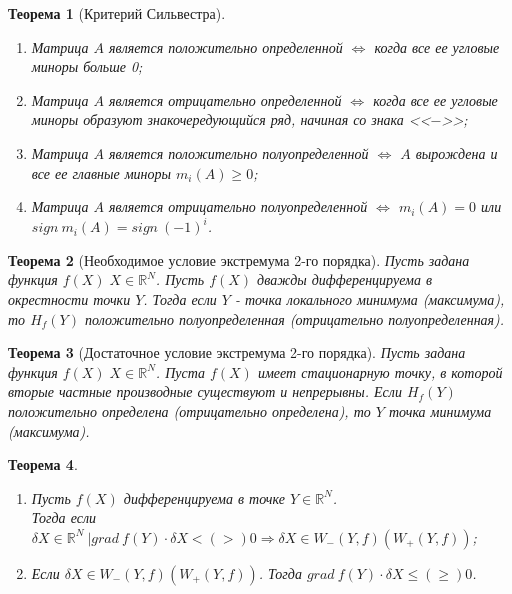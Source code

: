 \documentclass[12pt]{article}
\newtheorem{theorem}{Теорема}[section]
\theoremstyle{definition}
\theoremstyle{remark}
\begin{document}
\begin{theorem}[Критерий Сильвестра]
  \item
\begin{enumerate}
  \item Матрица $A$ является положительно определенной $\iff$ когда все ее угловые миноры больше 0;
  \item Матрица $A$ является отрицательно определенной $\iff$ когда все ее угловые миноры образуют знакочередующийся ряд, начиная со знака <<$-$>>;
  \item Матрица $A$ является положительно полуопределенной $\iff$ $A$ вырождена и все ее главные миноры $m_i(A)\geqslant 0$;
  \item Матрица $A$ является отрицательно полуопределенной $\iff$ $m_i(A)=0$ или $sign\:m_i(A)=sign\:(-1)^i$.
\end{enumerate}
\end{theorem}
\begin{theorem}[Необходимое условие экстремума 2-го порядка]
Пусть задана функция $f(X)\;X\in\mathbb{R}^N$. Пусть  $f(X)$ дважды дифференцируема в окрестности точки $Y$. Тогда если $Y$ - точка локального минимума (максимума), то $H_f(Y)$ положительно полуопределенная (отрицательно полуопределенная).
\end{theorem}
\begin{theorem}[Достаточное условие экстремума 2-го порядка]
Пусть задана функция $f(X)\;X\in\mathbb{R}^N$. Пуста $f(X)$ имеет стационарную точку, в которой вторые частные производные существуют и непрерывны. Если $H_f(Y)$ положительно определена (отрицательно определена), то $Y$ точка минимума (максимума).
\end{theorem}
\begin{theorem}
  \item
  \begin{enumerate}
    \item Пусть $f(X)$ дифференцируема в точке $Y\in\mathbb{R}^N$. \\Тогда если $\delta X\in\mathbb{R}^N \:\big| grad\:f(Y)\cdot \delta X <(>)0
  \Rightarrow \delta X \in W_-(Y,f)(W_+(Y,f))$;
  \item Если $\delta X \in W_-(Y,f)(W_+(Y,f))$. Тогда  $grad\:f(Y)\cdot \delta X \leqslant(\geqslant)0$.
  \end{enumerate}
\end{theorem}
\end{document}
